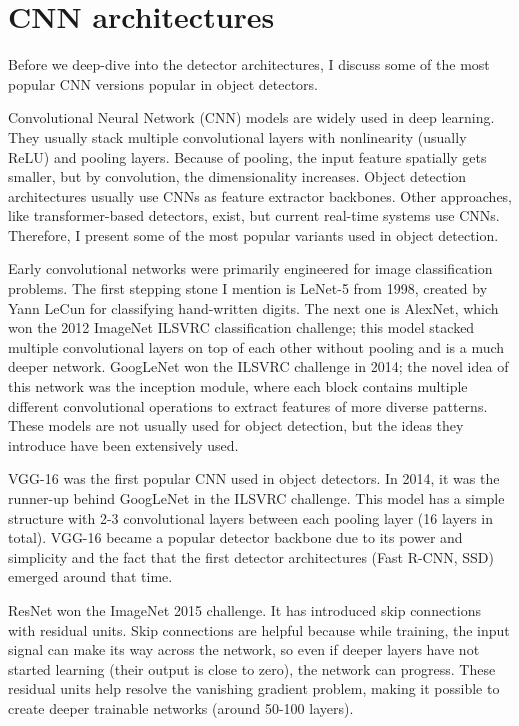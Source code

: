 \section{CNN architectures}

Before we deep-dive into the detector architectures, I discuss some of the most popular CNN versions popular in object detectors.

Convolutional Neural Network (CNN) models are widely used in deep learning. They usually stack multiple convolutional layers with nonlinearity (usually ReLU) and pooling layers. Because of pooling, the input feature spatially gets smaller, but by convolution, the dimensionality increases. Object detection architectures usually use CNNs as feature extractor backbones. Other approaches, like transformer-based detectors, exist, but current real-time systems use CNNs. Therefore, I present some of the most popular variants used in object detection.

Early convolutional networks were primarily engineered for image classification problems. The first stepping stone I mention is LeNet-5\cite{LeNet} from 1998, created by Yann LeCun for classifying hand-written digits. The next one is AlexNet\cite{AlexNet}, which won the 2012 ImageNet ILSVRC classification challenge\cite{ILSVRC}; this model stacked multiple convolutional layers on top of each other without pooling and is a much deeper network. GoogLeNet\cite{GoogLeNet} won the ILSVRC challenge in 2014; the novel idea of this network was the inception module, where each block contains multiple different convolutional operations to extract features of more diverse patterns. These models are not usually used for object detection, but the ideas they introduce have been extensively used.

VGG-16\cite{VGG16} was the first popular CNN used in object detectors. In 2014, it was the runner-up behind GoogLeNet in the ILSVRC challenge. This model has a simple structure with 2-3 convolutional layers between each pooling layer (16 layers in total). VGG-16 became a popular detector backbone due to its power and simplicity and the fact that the first detector architectures (Fast R-CNN, SSD) emerged around that time.

ResNet\cite{ResNet} won the ImageNet 2015 challenge. It has introduced skip connections with residual units. Skip connections are helpful because while training, the input signal can make its way across the network, so even if deeper layers have not started learning (their output is close to zero), the network can progress. These residual units help resolve the vanishing gradient problem, making it possible to create deeper trainable networks (around 50-100 layers).

